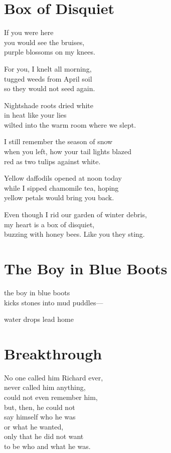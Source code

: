 \documentclass[twoside,10pt]{book}
\begin{document}
\clearpage
\section{Box of Disquiet}

If you were here\\
you would see the bruises,\\
purple blossoms on my knees.

For you, I knelt all morning,\\
tugged weeds from April soil\\
so they would not seed again.

Nightshade roots dried white\\
in heat like your lies\\
wilted into the warm room where we slept.

I still remember the season of snow\\
when you left, how your tail lights blazed\\
red as two tulips against white.

Yellow daffodils opened at noon today\\
while I sipped chamomile tea, hoping\\
yellow petals would bring you back.

Even though I rid our garden of winter debris,\\
my heart is a box of disquiet,\\
buzzing with honey bees. Like you they sting.


\clearpage
\section{The Boy in Blue Boots}

the boy in blue boots\\
kicks stones into mud puddles---

water drops lead home


\clearpage
\section{Breakthrough}

No one called him Richard ever,\\
never called him anything,\\
could not even remember him,\\
but, then, he could not\\
say himself who he was\\
or what he wanted,\\
only that he did not want\\
to be who and what he was.
\end{document}
